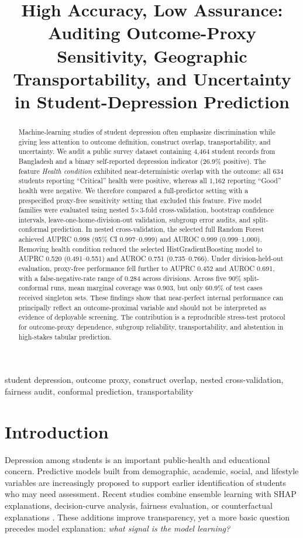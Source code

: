 \documentclass[conference]{IEEEtran}
\title{High Accuracy, Low Assurance: Auditing Outcome-Proxy Sensitivity, Geographic Transportability, and Uncertainty in Student-Depression Prediction}
\author{\IEEEauthorblockN{Anonymous Author(s)}
\IEEEauthorblockA{Anonymous Institution\\Under double-blind review}}
\begin{document}
\maketitle

\begin{abstract}
Machine-learning studies of student depression often emphasize discrimination while giving less attention to outcome definition, construct overlap, transportability, and uncertainty. We audit a public survey dataset containing 4,464 student records from Bangladesh and a binary self-reported depression indicator (26.9\% positive). The feature \emph{Health condition} exhibited near-deterministic overlap with the outcome: all 634 students reporting ``Critical'' health were positive, whereas all 1,162 reporting ``Good'' health were negative. We therefore compared a full-predictor setting with a prespecified proxy-free sensitivity setting that excluded this feature. Five model families were evaluated using nested 5$\times$3-fold cross-validation, bootstrap confidence intervals, leave-one-home-division-out validation, subgroup error audits, and split-conformal prediction. In nested cross-validation, the selected full Random Forest achieved AUPRC 0.998 (95\% CI 0.997--0.999) and AUROC 0.999 (0.999--1.000). Removing health condition reduced the selected HistGradientBoosting model to AUPRC 0.520 (0.491--0.551) and AUROC 0.751 (0.735--0.766). Under division-held-out evaluation, proxy-free performance fell further to AUPRC 0.452 and AUROC 0.691, with a false-negative-rate range of 0.284 across divisions. Across five 90\% split-conformal runs, mean marginal coverage was 0.903, but only 60.9\% of test cases received singleton sets. These findings show that near-perfect internal performance can principally reflect an outcome-proximal variable and should not be interpreted as evidence of deployable screening. The contribution is a reproducible stress-test protocol for outcome-proxy dependence, subgroup reliability, transportability, and abstention in high-stakes tabular prediction.
\end{abstract}

\begin{IEEEkeywords}
student depression, outcome proxy, construct overlap, nested cross-validation, fairness audit, conformal prediction, transportability
\end{IEEEkeywords}

\section{Introduction}
Depression among students is an important public-health and educational concern. Predictive models built from demographic, academic, social, and lifestyle variables are increasingly proposed to support earlier identification of students who may need assessment. Recent studies combine ensemble learning with SHAP explanations, decision-curve analysis, fairness evaluation, or counterfactual explanations \cite{chang2026interpretable,isiwu2026multilevel}. These additions improve transparency, yet a more basic question precedes model explanation: \emph{what signal is the model learning?}
\end{document}
